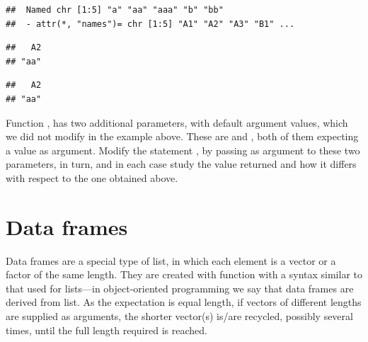 \documentclass[krantz2]{krantz}\usepackage{knitr}%
\begin{document}
\begin{knitrout}\footnotesize
{}\color{fgcolor}\begin{kframe}
\begin{alltt}
\end{alltt}
\begin{verbatim}
##  Named chr [1:5] "a" "aa" "aaa" "b" "bb"
##  - attr(*, "names")= chr [1:5] "A1" "A2" "A3" "B1" ...
\end{verbatim}
\begin{alltt}
\hlstd{c.vec[}\hlstd{]}
\end{alltt}
\begin{verbatim}
##   A2 
## "aa"
\end{verbatim}
\begin{alltt}
\hlstd{c.vec[}\hlstd{]}
\end{alltt}
\begin{verbatim}
##   A2 
## "aa"
\end{verbatim}
\end{kframe}
\end{knitrout}

\begin{playground}
Function , has two additional parameters, with default argument values, which we did not modify in the example above. These are  and , both of them expecting a  value as argument. Modify the statement , by passing  as argument to these two parameters, in turn, and in each case study the value returned and how it differs with respect to the one obtained above.
\end{playground}



\section{Data frames}\label{sec:R:data:frames}
Data frames are a special type of list, in which each element is a vector or a factor of the same length. They are created with function  with a syntax similar to that used for lists---in object-oriented programming we say that data frames are derived from list. As the expectation is equal length, if vectors of different lengths are supplied as arguments, the shorter vector(s) is/are recycled, possibly several times, until the full length required is reached.
\end{document}
